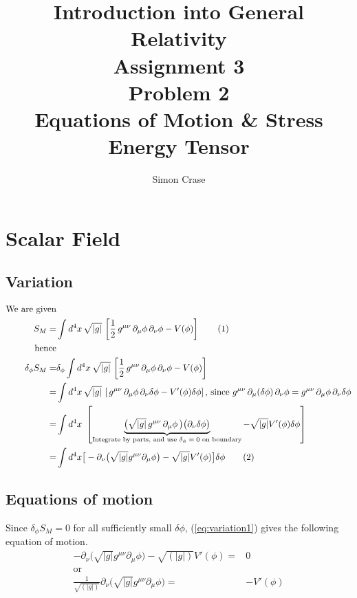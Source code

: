 \documentclass[]{article}
\title{Introduction into General Relativity\\Assignment 3\\Problem 2\\Equations of Motion \& Stress Energy Tensor}
\author{Simon Crase}
\newcommand\numberthis{\addtocounter{equation}{1}\tag{\theequation}}
\begin{document}
\maketitle
\thispagestyle{fancy}

 

\section{Scalar Field}
\subsection{Variation}
\begin{align*}
\text{We are given}&\\
S_M =& \int d^4x \, \sqrt{|g|} \, \left[\frac12 \, g^{\mu\nu} \, \partial_\mu \phi \, \partial_\nu \phi - V(\phi)\right] \numberthis \label{eq:action1}\\
\text{hence}&\\	
\delta_{\phi} S_M =& \delta_{\phi} \int d^4x \, \sqrt{|g|} \, \left[\frac{1}{2} \, g^{\mu\nu} \, \partial_\mu \phi \, \partial_\nu \phi - V(\phi)\right]\\
=&  \int d^4x \, \sqrt{|g|} \, \left[ \, g^{\mu\nu} \, \partial_\mu \phi \, \partial_\nu \delta \phi - V'(\phi) \delta \phi \right] \text{, since $g^{\mu\nu} \, \partial_\mu (\delta \phi) \, \partial_\nu \phi = g^{\mu\nu} \, \partial_\mu  \phi \, \partial_\nu \delta \phi$}\\
=&  \int d^4x \,  \, \left[ \underbrace{\big(\sqrt{|g|} \, g^{\mu\nu} \, \partial_\mu \phi \,\big) \big(\partial_\nu \delta \phi\big)}_\text{Integrate by parts, and use $\delta_{\phi}=0$ on boundary} - \sqrt{|g|} V'(\phi) \delta \phi \right] \\
=& \int d^4x \big[ -\partial_\nu \big(\sqrt{|g|} g^{\mu\nu} \partial_\mu \phi\big) - \sqrt{|g|} V'(\phi)\big] \delta \phi \numberthis \label{eq:variation1}
\end{align*}
\subsection{Equations of motion}
Since $\delta_{\phi} S_M=0$ for all sufficiently small $\delta \phi$, (\ref{eq:variation1}) gives the following equation of motion.
\begin{align*}
-\partial_\nu \big(\sqrt{|g|} g^{\mu\nu} \partial_\mu \phi\big) - \sqrt{(|g|)} V'(\phi)=&0\\
\text{or}&\\
\frac{1}{\sqrt{(|g|)}} \partial_\nu \big(\sqrt{|g|} g^{\mu\nu} \partial_\mu \phi\big) =& -  V'(\phi)
\end{align*}
\end{document}
